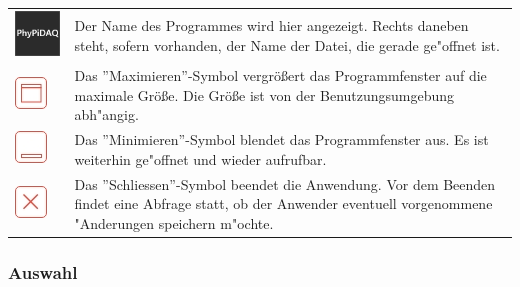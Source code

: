 \documentclass[parskip=full]{scrartcl}
\begin{document}
\begin{tabular}[t]{p{1cm} p{10cm}}
	\vspace{0cm}\includegraphics[width = 1 cm]{Grafik/PhyPiDAQ.jpg} & Der Name des Programmes wird hier angezeigt. Rechts daneben steht, sofern vorhanden, der Name der Datei, die gerade ge"offnet ist.\newline\\
	\vspace{0cm}\includegraphics[width = 1 cm]{Grafik/Maximieren.jpg} & Das ''Maximieren''-Symbol vergrößert das Programmfenster auf die maximale Größe. Die Größe ist von der Benutzungsumgebung abh"angig.\newline\\
	\vspace{0cm}\includegraphics[width = 1 cm]{Grafik/Minimieren.jpg} & Das ''Minimieren''-Symbol blendet das Programmfenster aus. Es ist weiterhin ge"offnet und wieder aufrufbar. \\
	\vspace{0cm}\includegraphics[width = 1 cm]{Grafik/Schliessen.jpg} & Das ''Schliessen''-Symbol beendet die Anwendung. Vor dem Beenden findet eine Abfrage statt, ob der Anwender eventuell vorgenommene "Anderungen speichern m"ochte.\newline\\
\end{tabular}

\subsubsection{Auswahl}
\end{document}
